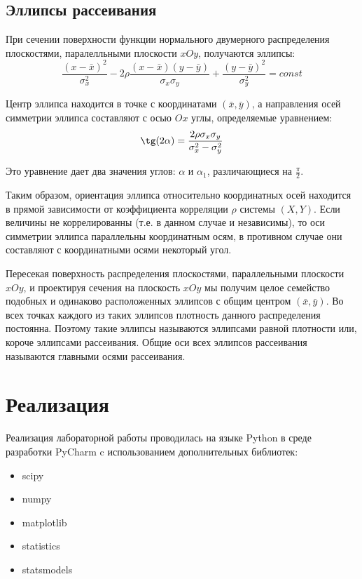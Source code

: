 \documentclass[12pt,a4paper]{article}
\begin{document}
\subsection{Эллипсы рассеивания}
При сечении поверхности функции нормального двумерного распределения плоскостями, паралелльными плоскости $xOy$, получаются эллипсы:
\begin{equation}
    \frac{(x-\bar{x})^2}{\sigma_x^2}-2\rho\frac{(x-\bar{x})(y-\bar{y})}{\sigma_x\sigma_y}+\frac{(y-\bar{y})^2}{\sigma_y^2}=const
\end{equation}

Центр эллипса находится в точке с координатами $(\bar{x},\bar{y})$, а направления осей симметрии эллипса составляют с осью $Ox$ углы, определяемые уравнением:
\begin{equation}
    \tg(2\alpha)=\frac{2\rho\sigma_x\sigma_y}{\sigma_x^2-\sigma_y^2}
\end{equation}

Это уравнение дает два значения углов: $\alpha$ и $\alpha_1$, различающиеся на $\frac{\pi}{2}$.

Таким образом, ориентация эллипса относительно координатных осей находится в прямой зависимости от коэффициента корреляции $\rho$ системы $(X,Y)$. Если величины не коррелированны (т.е. в данном случае и независимы), то оси симметрии эллипса параллельны координатным осям, в противном случае они составляют с координатными осями некоторый угол.

Пересекая поверхность распределения плоскостями, параллельными плоскости $xOy$, и проектируя сечения на плоскость $xOy$ мы получим целое семейство подобных и одинаково расположенных эллипсов с общим центром $(\bar{x},\bar{y})$. Во всех точках каждого из таких эллипсов плотность данного распределения постоянна. Поэтому такие эллипсы называются эллипсами равной плотности или, короче эллипсами рассеивания. Общие оси всех эллипсов рассеивания называются главными осями рассеивания.

\section{Реализация}
Реализация лабораторной работы проводилась на языке Python в среде разработки PyCharm c использованием дополнительных библиотек:
\begin{itemize}
    \item scipy
    \item numpy
    \item matplotlib
    \item statistics
    \item statsmodels
\end{itemize}
\end{document}
